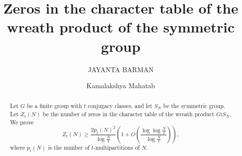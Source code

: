 \documentclass[11pt]{amsart}
\theoremstyle{plain}
\numberwithin{equation}{section}
\begin{document}
	\title[Zeros in the character table of the wreath product of the symmetric group
	]
	{Zeros in the character table of the wreath product of the symmetric group} 
	\author{JAYANTA BARMAN}
	\address{JAYANTA BARMAN\\ Department of Mathematics \\
		Indian Institute of Technology Kharagpur \\
		Kharagpur-721302,  India.} 
	
	\author{Kamalakshya Mahatab}
	\address{Kamalakshya Mahatab\\ Department of Mathematics \\
		Indian Institute of Technology Kharagpur \\
		Kharagpur-721302,  India.} 
	
	\begin{abstract} 
		Let $G$ be a finite group with $t$ conjugacy classes, and let $S_N$ be the symmetric group. Let $Z_t(N)$ be the
		number of zeros in the character table of the wreath product
		$G\wr S_N$. We prove 
		\begin{equation*}
			Z_t(N)\ge \frac{2p_t(N)^{2}}{\log \frac{N}{t}}\left(1+O\left(\frac{\log \log \frac{N}{t}}{\log \frac{N}{t}}\right)\right),
		\end{equation*}
		where $p_t(N)$ is the number of $t$-multipartitions of $N$.
	\end{abstract}
	
	\maketitle
\end{document}
